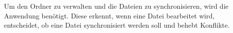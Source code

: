 Um den Ordner zu verwalten und die Dateien zu synchronisieren, wird die Anwendung benötigt. Diese erkennt, wenn eine Datei bearbeitet wird, entscheidet, ob eine Datei synchronisiert werden soll und behebt Konflikte.